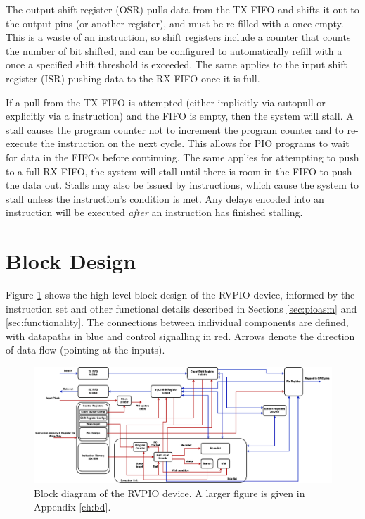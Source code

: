 The output shift register (OSR) pulls data from the TX FIFO and shifts it out to the output pins (or another register), and must be re-filled with a  once empty. This is a waste of an instruction, so shift registers include a counter that counts the number of bit shifted, and can be configured to automatically refill with a  once a specified shift threshold is exceeded. The same applies to the input shift register (ISR) pushing data to the RX FIFO once it is full.

If a pull from the TX FIFO is attempted (either implicitly via autopull or explicitly via a  instruction) and the FIFO is empty, then the system will stall. A stall causes the program counter not to increment the program counter and to re-execute the instruction on the next cycle. This allows for PIO programs to wait for data in the FIFOs before continuing. The same applies for attempting to push to a full RX FIFO, the system will stall until there is room in the FIFO to push the data out. Stalls may also be issued by  instructions, which cause the system to stall unless the instruction's condition is met. Any delays encoded into an instruction will be executed \textit{after} an instruction has finished stalling.

\section{Block Design}

Figure \ref{fig:bd} shows the high-level block design of the RVPIO device, informed by the instruction set and other functional details described in Sections \ref{sec:pioasm} and \ref{sec:functionality}. The connections between individual components are defined, with datapaths in blue and control signalling in red. Arrows denote the direction of data flow (pointing at the inputs).

\begin{figure}[H]
    \centering
    \includegraphics[width=1\textwidth]{../img/bd.png}
    \caption{Block diagram of the RVPIO device. A larger figure is given in Appendix \ref{ch:bd}.}
    \label{fig:bd}
\end{figure}

